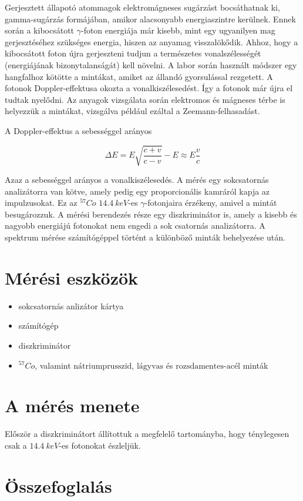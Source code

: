 \documentclass[a4paper,12pt]{article}
\begin{document}
\par Gerjesztett állapotó atommagok elektromágneses sugárzást bocsáthatnak ki, gamma-sugárzás formájában, amikor alacsonyabb energiaszintre kerülnek. Ennek során a kibocsátott $\gamma$-foton energiája már kisebb, mint egy ugyanilyen mag gerjesztéséhez szükséges energia, hiszen az anyamag visszalökődik. Ahhoz, hogy a kibocsátott foton újra gerjeszteni tudjun a természetes vonalszélességét (energiájának bizonytalanságát) kell növelni. A labor során használt módszer egy hangfalhoz kötötte a mintákat, amiket az állandó gyorsulással rezgetett. A fotonok Doppler-effektusa okozta a vonalkiszélesedést. Így a fotonok már újra el tudtak nyelődni. Az anyagok vizsgálata során elektromos és mágneses térbe is helyezzük a mintákat, vizsgálva például ezáltal a Zeemann-felhasadást.

\vspace{5mm}

\par A Doppler-effektus a sebességgel arányos

\begin{equation*}
	\Delta E = E\sqrt{\frac{c+v}{c-v}} - E \approx E\frac{v}{c}
\end{equation*}

\par Azaz a sebességgel arányos a vonalkiszélesedés. A mérés egy sokcsatornás analizátorra van kötve, amely pedig egy proporcionális kamráról kapja az impulzusokat. Ez az $^{57}Co$ $14.4~keV$-es $\gamma$-fotonjaira érzékeny, amivel a mintát besugározzuk. A mérési berendezés része egy diszkriminátor is, amely a kisebb és nagyobb energiájú fotonokat nem engedi a sok csatornás analizátorra. A spektrum mérése számítógéppel történt a különböző minták behelyezése után.

\section{Mérési eszközök}

\begin{itemize}
\item sokcsatornás anlizátor kártya
\item számítógép
\item diszkriminátor
\item $^{57}Co$, valamint $\text{nátriumprusszid}$,
$\text{lágyvas}$ és $\text{rozsdamentes-acél}$ minták
\end{itemize}

\section{A mérés menete}

\par Először a diszkriminátort állítottuk a megfelelő tartományba, hogy ténylegesen csak a $14.4~keV$-es fotonokat észleljük. 

\section{Összefoglalás}

\par 
\end{document}
